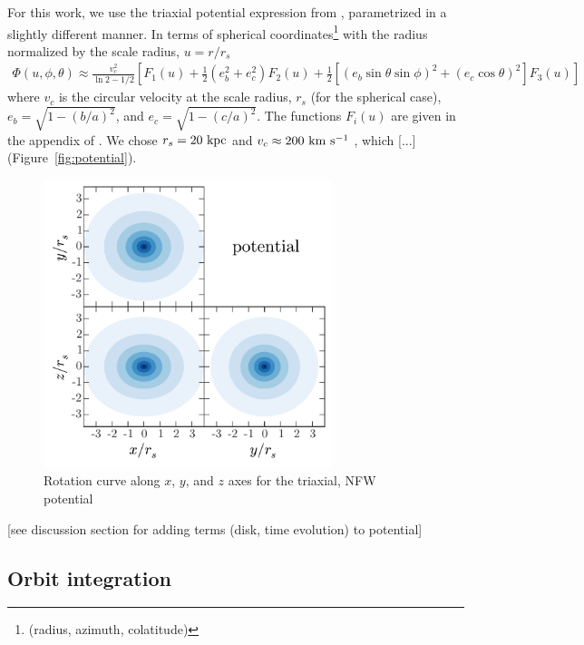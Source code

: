 \documentclass[letterpaper,12pt,preprint]{aastex}
\begin{document}
For this work, we use the triaxial potential expression from \citet{lee03}, parametrized in a slightly different manner. In terms of spherical coordinates\footnote{(radius, azimuth, colatitude)} with the radius normalized by the scale radius, $u = r/r_s$
\begin{align}
	\Phi(u,\phi,\theta) \approx \frac{v_c^2}{\ln2 - 1/2}\left[F_1(u) + \frac{1}{2}(e_b^2 + e_c^2)F_2(u) + \frac{1}{2} [(e_b\sin\theta \sin\phi)^2 + (e_c\cos\theta)^2] F_3(u) \right]
\end{align}
where $v_c$ is the circular velocity at the scale radius, $r_s$ (for the spherical case), $e_b = \sqrt{1 - (b/a)^2}$, and $e_c = \sqrt{1 - (c/a)^2}$. The functions $F_i(u)$ are given in the appendix of \cite{lee03}. We chose $r_s=20~{\rm kpc}$ and $v_c \approx 200~{\rm km}~{\rm s}^{-1}$ , which [...] (Figure~\ref{fig:potential}).

\begin{figure}[!h]
\begin{center}
\includegraphics[width=0.75\textwidth]{figures/potential.pdf}
\caption{Rotation curve along $x$, $y$, and $z$ axes for the triaxial, NFW potential } \label{fig:orbit-tree}
\end{center}
\end{figure}

[see discussion section for adding terms (disk, time evolution) to potential]

\subsection{Orbit integration}
\end{document}
